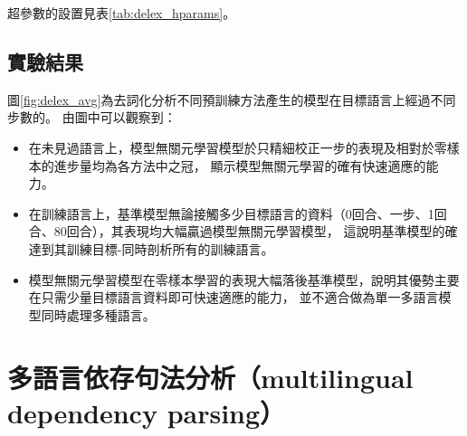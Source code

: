 超參數的設置見表\ref{tab:delex_hparams}。
\subsection{實驗結果}




圖\ref{fig:delex_avg}為去詞化分析不同預訓練方法產生的模型在目標語言上經過不同步數的。
由圖中可以觀察到：
\begin{itemize}
    \item 在未見過語言上，模型無關元學習模型於只精細校正一步的表現及相對於零樣本的進步量均為各方法中之冠，
顯示模型無關元學習的確有快速適應的能力。
    \item 在訓練語言上，基準模型無論接觸多少目標語言的資料（0回合、一步、1回合、80回合），其表現均大幅贏過模型無關元學習模型，
    這說明基準模型的確達到其訓練目標-同時剖析所有的訓練語言。
    \item 模型無關元學習模型在零樣本學習的表現大幅落後基準模型，說明其優勢主要在只需少量目標語言資料即可快速適應的能力，
    並不適合做為單一多語言模型同時處理多種語言。
\end{itemize}













\section{多語言依存句法分析（multilingual dependency parsing）}

